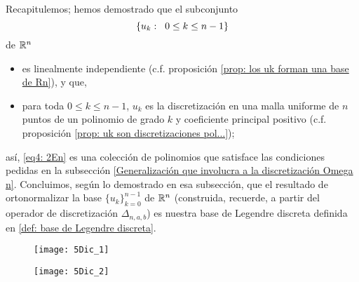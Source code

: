 Recapitulemos; hemos demostrado que 
el subconjunto
\begin{equation}
\label{eq4: 2En}
\{u_{k}: \hspace{0.2cm} 0\leq k \leq n-1 \}
\end{equation}
de $\mathbb{R}^{n}$
\begin{itemize}
\item es linealmente independiente 
(c.f. proposición \ref{prop: los uk forman una base de Rn}), y que,
\item para toda $0\leq k \leq n-1$, $u_{k}$
es la discretización en una malla uniforme
de $n$ puntos de un polinomio de grado $k$
y coeficiente principal positivo
(c.f. proposición \ref{prop: uk son discretizaciones pol...});
\end{itemize}
así, \eqref{eq4: 2En} es una colección de
polinomios que satisface las condiciones pedidas  
en la subsección
\ref{Generalización que involucra a la discretización Omega n}.
Concluimos, según lo demostrado en esa subsección, 
que el resultado de ortonormalizar la 
base $\{u_{k}\}_{k=0}^{n-1}$ de $\mathbb{R}^{n}$
(construida, recuerde, a partir del operador de 
discretización $\Delta_{n, a, b}$)
es nuestra base de Legendre
discreta definida en 
\ref{def: base de Legendre discreta}.

\begin{figure}[H]
	\centering
	\texttt{[image: 5Dic\_1]} 
\end{figure}	

        
\begin{figure}[H]
	\centering
	\texttt{[image: 5Dic\_2]} 
\end{figure}	